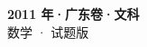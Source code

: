 \documentclass[zihao=-4, a4paper]{ctexart}
\begin{document}
\begin{center}
  {\Large\bfseries 2011 年·广东卷·文科}\\[4pt]
  {\large 数学 · 试题版}
\end{center}
\medskip
{}

\end{document}
